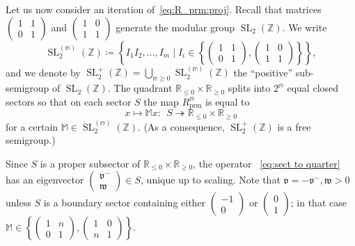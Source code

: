 \documentclass{amsart}
\newcommand{\SL}{\operatorname {SL}}
\renewcommand{\sp}{{\ \ }}
\newcommand{\1}{{\mathbb 1 }}
\newcommand\M{\mathbb M}
\newcommand\prm{{\operatorname{prm}}}
\newcommand\cRRc{R_{\prm}}%
\newcommand{\mm}{\mathbb{m}}
\newcommand{\vv}{\mathfrak{v}}
\newcommand{\ww}{\mathfrak{w}}
\newcommand{\R}{\mathbb{R}}
\newcommand{\Z}{\mathbb{Z}}
\theoremstyle{remark}
\numberwithin{equation}{section}
\theoremstyle{definition}
\theoremstyle{nonumberbreak}
\begin{document}
Let us now consider an iteration of~\eqref{eq:R_prm:proj}. Recall that matrices  $\left(\begin{matrix}
        1 &1\\0 &1
        \end{matrix}\right)$ and $\left(\begin{matrix}
        1 &0\\1 &1
        \end{matrix}\right)$ generate the modular group $\SL_2(\Z)$. We write  \[\SL^{(\mm)}_2(\Z)\coloneqq \left\{I_1I_2,\dots, I_m\mid I_i \in \left\{\left(\begin{matrix}
        1 &1\\0 &1
        \end{matrix}\right), \left(\begin{matrix}
        1 &0\\1 &1
        \end{matrix}\right) \right\}\right\},\] and we denote by $\SL^+_2(\Z)=\displaystyle \bigcup_{\mm\ge 0}\SL_2^{(\mm)}(\Z)$ the ``positive'' sub-semigroup of $\SL_2(\Z)$. The quadrant $\R_{\le 0}\times\R_{\ge 0}$ splits into $2^\mm$ equal closed sectors so that on each sector $S$ the map $\cRRc^\mm$ is equal to 
\begin{equation}
  \label{eq:sect to quarter}      
          x\mapsto \M x \colon\sp  S \twoheadrightarrow\R_{\le0}\times \R_{\ge 0}        
\end{equation} for a certain $\M\in \SL_2^{(\mm)}(\Z)$. (As a consequence, $\SL^+_2(\Z)$ is a free semigroup.)  


Since $S$ is a proper subsector of $ \R_{\le0}\times \R_{\ge 0} $, the operator ~\eqref{eq:sect to quarter} has an eigenvector $\left(\begin{matrix}
        \vv^- \\ \ww
        \end{matrix}\right)\in S$,  unique up to scaling. Note that $\vv=-\vv^-,\ww>0$ unless $S$ is a boundary sector containing either $\left(\begin{matrix}
        -1\\0
        \end{matrix}\right)$ or $\left(\begin{matrix}
        0\\1
        \end{matrix}\right)$; in that case $\M \in \left\{ \left(\begin{matrix}
        1 &n\\0 &1
        \end{matrix}\right), \left(\begin{matrix}
        1 &0\\n &1
        \end{matrix}\right)\right\}$. 
        
\end{document}

